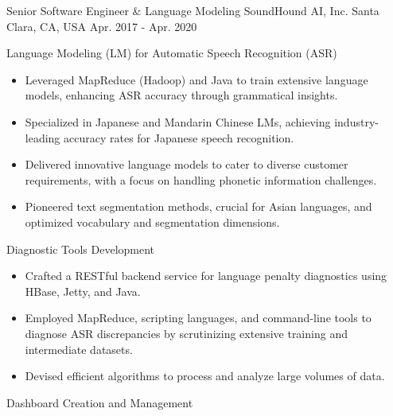 

\begin{cventries}

  \cventry
    {Senior Software Engineer \& Language Modeling} %
    {SoundHound AI, Inc.} %
    {Santa Clara, CA, USA} %
    {Apr. 2017 - Apr. 2020} %
    {
      \begin{cvitems} %
        \item Language Modeling (LM) for Automatic Speech Recognition (ASR)
        \begin{itemize}
          \item Leveraged MapReduce (Hadoop) and Java to train extensive language models, enhancing ASR accuracy through grammatical insights.
          \item Specialized in Japanese and Mandarin Chinese LMs, achieving industry-leading accuracy rates for Japanese speech recognition.
          \item Delivered innovative language models to cater to diverse customer requirements, with a focus on handling phonetic information challenges.
          \item Pioneered text segmentation methods, crucial for Asian languages, and optimized vocabulary and segmentation dimensions.
        \end{itemize}
        \item Diagnostic Tools Development
        \begin{itemize}
          \item Crafted a RESTful backend service for language penalty diagnostics using HBase, Jetty, and Java.
          \item Employed MapReduce, scripting languages, and command-line tools to diagnose ASR discrepancies by scrutinizing extensive training and intermediate datasets.
          \item Devised efficient algorithms to process and analyze large volumes of data.
        \end{itemize}
        \item Dashboard Creation and Management

\end{cvitems}}
\end{cventries}
